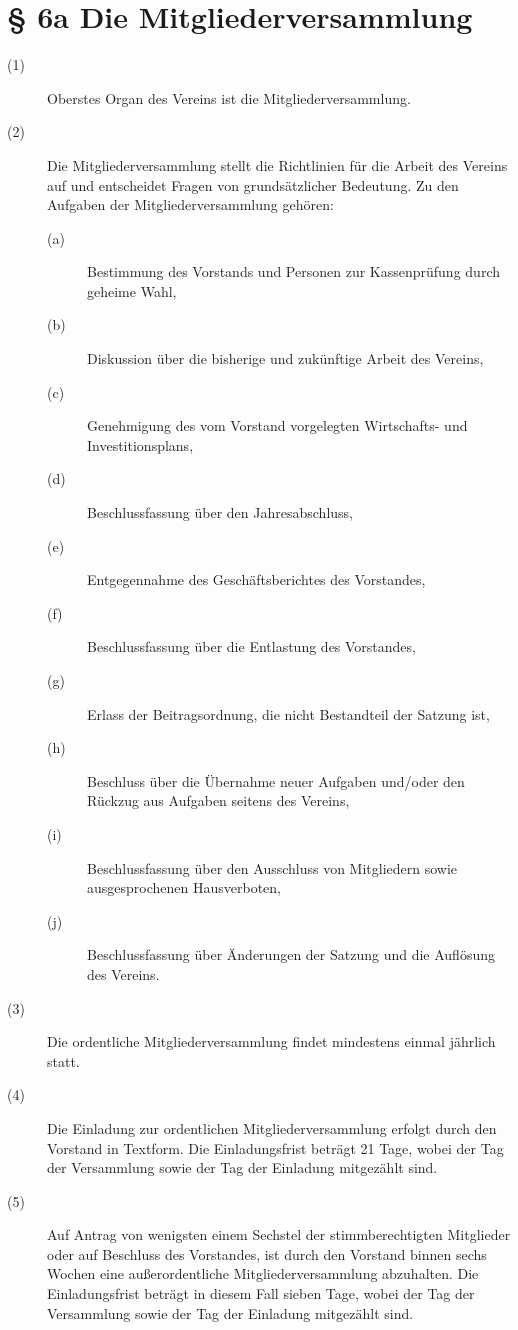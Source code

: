 \documentclass[a4paper,12pt]{scrartcl}
\begin{document}
\section*{\S{} 6a Die Mitgliederversammlung}
\begin{description} 

\item[(1)] Oberstes Organ des Vereins ist die Mitgliederversammlung.
\item[(2)] Die Mitgliederversammlung stellt die Richtlinien für die Arbeit des Vereins auf und entscheidet Fragen von grundsätzlicher Bedeutung. Zu den Aufgaben der Mitgliederversammlung gehören:
\begin{description} 
\item[(a)] Bestimmung des Vorstands und Personen zur Kassenprüfung durch geheime Wahl,
\item[(b)] Diskussion über die bisherige und zukünftige Arbeit des Vereins,
\item[(c)] Genehmigung des vom Vorstand vorgelegten Wirtschafts- und Investitionsplans,
\item[(d)] Beschlussfassung über den Jahresabschluss,
\item[(e)] Entgegennahme des Geschäftsberichtes des Vorstandes,
\item[(f)] Beschlussfassung über die Entlastung des Vorstandes,
\item[(g)] Erlass der Beitragsordnung, die nicht Bestandteil der Satzung ist,
\item[(h)] Beschluss über die Übernahme neuer Aufgaben und/oder den Rückzug aus Aufgaben seitens des Vereins,
\item[(i)] Beschlussfassung über den Ausschluss von Mitgliedern sowie ausgesprochenen Hausverboten,
\item[(j)] Beschlussfassung über Änderungen der Satzung und die Auflösung des Vereins.
\end{description}
\item[(3)] Die ordentliche Mitgliederversammlung findet mindestens einmal jährlich statt.
\item[(4)] Die Einladung zur ordentlichen Mitgliederversammlung erfolgt durch den Vorstand in Textform. Die Einladungsfrist beträgt 21 Tage, wobei der Tag der Versammlung sowie der Tag der Einladung mitgezählt sind.
\item[(5)] Auf Antrag von wenigsten einem Sechstel der stimmberechtigten Mitglieder oder auf Beschluss des Vorstandes, ist durch den Vorstand binnen sechs Wochen eine außerordentliche Mitgliederversammlung abzuhalten. Die Einladungsfrist beträgt in diesem Fall sieben Tage, wobei der Tag der Versammlung sowie der Tag der Einladung mitgezählt sind.

\end{description}
\end{document}
